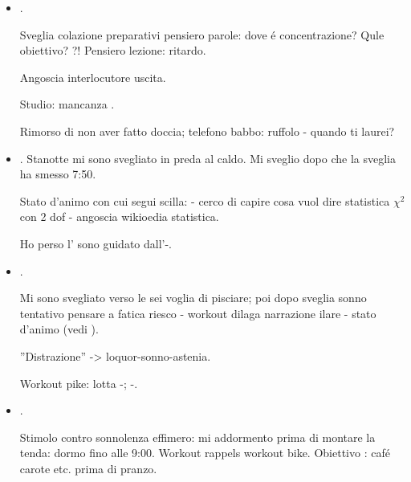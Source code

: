 \begin{itemize}
Workout e poi mattina senza problemi.

Paolicchi: ''salute'' - ascoltare - stallo.

Degl'innocenti -  incontro. Stato d'animo angoscia-attesa saluto.

WOrkout: tessera coop e pike compression. Difficolt\'a mantenere concentrazione-pensiero; sensazione ricordo vista senza occhiali: mi ricordo.

\item {}.

Sveglia colazione preparativi pensiero parole: dove \'e concentrazione? Qule obiettivo?  ?! Pensiero lezione: ritardo.

Angoscia interlocutore uscita.

Studio:  mancanza .

Rimorso di non aver fatto doccia; telefono babbo: ruffolo - quando ti laurei?

\item {}. Stanotte mi sono svegliato in preda al caldo. Mi sveglio dopo che la sveglia ha smesso 7:50.

Stato d'animo con cui segui scilla:  - cerco di capire cosa vuol dire statistica $\chi^2$ con 2 dof - angoscia wikioedia statistica.

Ho perso l' sono guidato dall'-.

\item {}.

Mi sono svegliato verso le sei voglia di pisciare; poi dopo sveglia sonno tentativo pensare a fatica riesco - workout dilaga narrazione ilare - stato d'animo  (vedi ).

''Distrazione'' -> loquor-sonno-astenia.

Workout pike: lotta -; -.

\item {}.

Stimolo contro sonnolenza effimero: mi addormento prima di montare la tenda: dormo fino alle 9:00. Workout rappels workout bike. Obiettivo : caf\'e carote etc. prima di pranzo.


\end{itemize}

